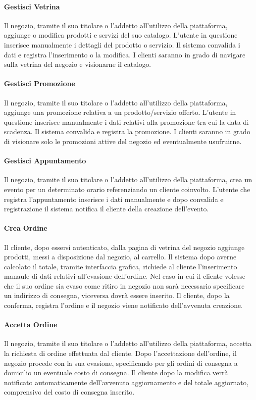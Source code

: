\paragraph{Gestisci Vetrina} Il negozio, tramite il suo titolare o l'addetto all'utilizzo della piattaforma, aggiunge o modifica prodotti e servizi del suo catalogo. L'utente in questione inserisce manualmente i dettagli del prodotto o servizio. Il sistema convalida i dati e registra l'inserimento o la modifica. I clienti saranno in grado di navigare sulla vetrina del negozio e visionarne il catalogo.
\paragraph{Gestisci Promozione} Il negozio, tramite il suo titolare o l'addetto all'utilizzo della piattaforma, aggiunge una promozione relativa a un prodotto/servizio offerto. L'utente in questione inserisce manualmente i dati relativi alla promozione tra cui la data di scadenza. Il sistema convalida e registra la promozione. I clienti saranno in grado di visionare solo le promozioni attive del negozio ed eventualmente usufruirne.
\paragraph{Gestisci Appuntamento} Il negozio, tramite il suo titolare o l'addetto all'utilizzo della piattaforma, crea un evento per un determinato orario referenziando un cliente coinvolto. L'utente che registra l'appuntamento inserisce i dati manualmente e dopo convalida e registrazione il sistema notifica il cliente della creazione dell'evento.
\paragraph{Crea Ordine} Il cliente, dopo essersi autenticato, dalla pagina di vetrina del negozio aggiunge prodotti, messi a disposizione dal negozio, al carrello. Il sistema dopo averne calcolato il totale, tramite interfaccia grafica, richiede al cliente l'inserimento manaule di dati relativi all'evasione dell'ordine. Nel caso in cui il cliente volesse che il suo ordine sia evaso come ritiro in negozio non sarà necessario specificare un indirizzo di consegna, viceversa dovrà essere inserito. Il cliente, dopo la conferma, registra l'ordine e il negozio viene notificato dell'avvenuta creazione.
\paragraph{Accetta Ordine} Il negozio, tramite il suo titolare o l'addetto all'utilizzo della piattaforma, accetta la richiesta di ordine effettuata dal cliente. Dopo l'accettazione dell'ordine, il negozio procede con la sua evasione, specificando per gli ordini di consegna a domicilio un eventuale costo di consegna. Il cliente dopo la modifica verrà notificato automaticamente dell'avvenuto aggiornamento e del totale aggiornato, comprensivo del costo di consegna inserito.
